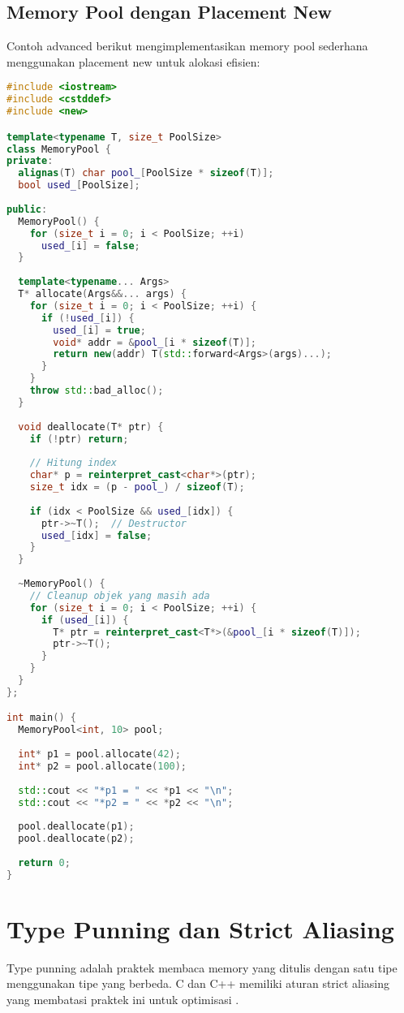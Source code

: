\documentclass[../main.tex]{subfiles}
\begin{document}
\subsection{Memory Pool dengan Placement New}

Contoh advanced berikut mengimplementasikan memory pool sederhana menggunakan placement new untuk alokasi efisien:

\begin{lstlisting}[language=C++, caption={Simple memory pool}]
#include <iostream>
#include <cstddef>
#include <new>

template<typename T, size_t PoolSize>
class MemoryPool {
private:
  alignas(T) char pool_[PoolSize * sizeof(T)];
  bool used_[PoolSize];
  
public:
  MemoryPool() {
    for (size_t i = 0; i < PoolSize; ++i)
      used_[i] = false;
  }
  
  template<typename... Args>
  T* allocate(Args&&... args) {
    for (size_t i = 0; i < PoolSize; ++i) {
      if (!used_[i]) {
        used_[i] = true;
        void* addr = &pool_[i * sizeof(T)];
        return new(addr) T(std::forward<Args>(args)...);
      }
    }
    throw std::bad_alloc();
  }
  
  void deallocate(T* ptr) {
    if (!ptr) return;
    
    // Hitung index
    char* p = reinterpret_cast<char*>(ptr);
    size_t idx = (p - pool_) / sizeof(T);
    
    if (idx < PoolSize && used_[idx]) {
      ptr->~T();  // Destructor
      used_[idx] = false;
    }
  }
  
  ~MemoryPool() {
    // Cleanup objek yang masih ada
    for (size_t i = 0; i < PoolSize; ++i) {
      if (used_[i]) {
        T* ptr = reinterpret_cast<T*>(&pool_[i * sizeof(T)]);
        ptr->~T();
      }
    }
  }
};

int main() {
  MemoryPool<int, 10> pool;
  
  int* p1 = pool.allocate(42);
  int* p2 = pool.allocate(100);
  
  std::cout << "*p1 = " << *p1 << "\n";
  std::cout << "*p2 = " << *p2 << "\n";
  
  pool.deallocate(p1);
  pool.deallocate(p2);
  
  return 0;
}
\end{lstlisting}

\section{Type Punning dan Strict Aliasing}
Type punning adalah praktek membaca memory yang ditulis dengan satu tipe menggunakan tipe yang berbeda. C dan C++ memiliki aturan strict aliasing yang membatasi praktek ini untuk optimisasi \parencite{iso-c-draft-n1570,cpp-reference}.
\end{document}
